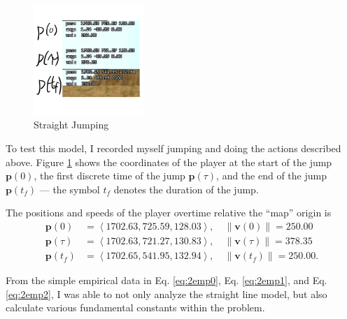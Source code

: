 \documentclass[a4paper,12pt]{article}
\newcommand{\tvec}[1]{\boldsymbol{#1}}
\newcommand{\tmag}[1]{\|#1\|}
\newcommand{\tang}[1]{\left\langle #1 \right\rangle}
\newcommand{\tv}{\tvec{v}}
\newcommand{\tp}{\tvec{p}}
\begin{document}
\begin{figure}
    \includegraphics[width=0.37\textwidth,right]{assets/2straightjumping.png}
    \caption{Straight Jumping}
    \label{fig:2straightjumping}
\end{figure}

To test this model, I recorded myself jumping and doing the actions described above. Figure \ref{fig:2straightjumping} shows the coordinates of the player at the start of the jump $\tp(0)$, the first discrete time of the jump $\tp(\tau)$, and the end of the jump $\tp(t_f)$ --- the symbol $t_f$ denotes the duration of the jump.

The positions and speeds of the player overtime relative the ``map'' origin is
\begin{align}
 \tp(0) &= \tang{1702.63, 725.59, 128.03}, \quad \tmag{\tv(0)} = 250.00 \label{eq:2emp0}\\
 \tp(\tau) &= \tang{1702.63, 721.27, 130.83}, \quad \tmag{\tv(\tau)} = 378.35 \label{eq:2emp1}\\
 \tp(t_f) &= \tang{1702.65,541.95, 132.94}, \quad \tmag{\tv(t_f)} = 250.00 \label{eq:2emp2}.
\end{align}

From the simple empirical data in Eq. \ref{eq:2emp0}, Eq. \ref{eq:2emp1}, and Eq. \ref{eq:2emp2}, I was able to not only analyze the straight line model, but also calculate various fundamental constants within the problem.












%
\newpage
%
\newpage
%
\newpage


\nocite{*}
\newpage
\printbibliography
\end{document}

